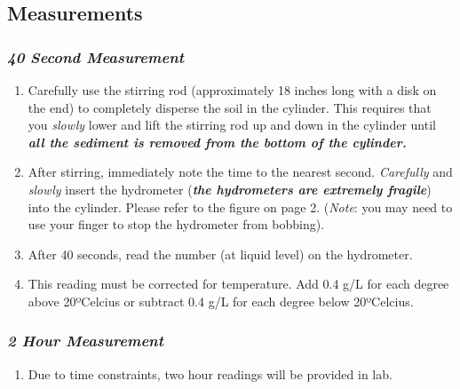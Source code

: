 \documentclass[
  letterpaper,
  DIV=11,
  numbers=noendperiod]{scrreprt}
\providecommand{\tightlist}{%
  \setlength{\itemsep}{0pt}\setlength{\parskip}{0pt}}\usepackage{longtable,booktabs,array}
\begin{document}
\hypertarget{measurements}{%
\subsection{Measurements}\label{measurements}}

\hypertarget{second-measurement}{%
\subsubsection{\texorpdfstring{\emph{40 Second
Measurement}}{40 Second Measurement}}\label{second-measurement}}

\begin{enumerate}
\def\labelenumi{\arabic{enumi}.}
\item
  Carefully use the stirring rod (approximately 18 inches long with a
  disk on the end) to completely disperse the soil in the cylinder. This
  requires that you \emph{slowly} lower and lift the stirring rod up and
  down in the cylinder until \textbf{\emph{all the sediment is removed
  from the bottom of the cylinder.}}
\item
  After stirring, immediately note the time to the nearest second.
  \emph{Carefully} and \emph{slowly} insert the hydrometer
  (\textbf{\emph{the hydrometers are extremely fragile}}) into the
  cylinder. Please refer to the figure on page 2. (\emph{Note}: you may
  need to use your finger to stop the hydrometer from bobbing).
\item
  After 40 seconds, read the number (at liquid level) on the hydrometer.
\item
  This reading must be corrected for temperature. Add 0.4 g/L for each
  degree above 20ºCelcius or subtract 0.4 g/L for each degree below
  20ºCelcius.
\end{enumerate}

\hypertarget{hour-measurement}{%
\subsubsection{\texorpdfstring{\emph{2 Hour
Measurement}}{2 Hour Measurement}}\label{hour-measurement}}

\begin{enumerate}
\def\labelenumi{\arabic{enumi}.}
\tightlist
\item
  Due to time constraints, two hour readings will be provided in lab.
\end{enumerate}
\end{document}

